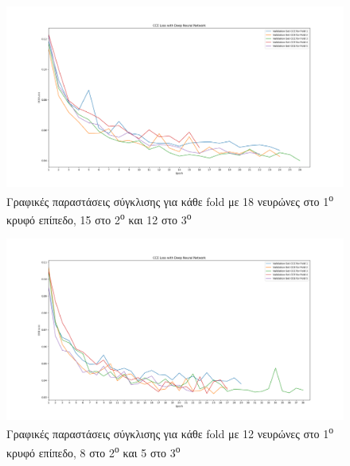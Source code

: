 \documentclass[12pt,a4paper]{article}
\begin{document}
\begin{figure}[H]
	\includegraphics[width=\textwidth]{Screenshots/32. hidden layers 18 - 15 - 12.png}
    \caption{Γραφικές παραστάσεις σύγκλισης για κάθε fold με 18 νευρώνες στο 1\textsuperscript{ο} κρυφό επίπεδο, 15 στο 2\textsuperscript{ο} και 12 στο 3\textsuperscript{ο}}
\end{figure}

\begin{figure}[H]
	\includegraphics[width=\textwidth]{Screenshots/33. hidden layers 23 - 20 - 18.png}
    \caption{Γραφικές παραστάσεις σύγκλισης για κάθε fold με 12 νευρώνες στο 1\textsuperscript{ο} κρυφό επίπεδο, 8 στο 2\textsuperscript{ο} και 5 στο 3\textsuperscript{ο}}
\end{figure}
\end{document}
